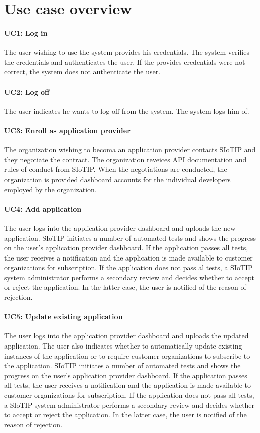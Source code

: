 \documentclass[english]{sareport}
\begin{document}
\section{Use case overview}\label{sec:uc_overview}
\paragraph{UC1: Log in}
The user wishing to use the system provides his credentials.
The system verifies the credentials and authenticates the user.
If the provides credentials were not correct, the system does not authenticate the user.

\paragraph{UC2: Log off}
The user indicates he wants to log off from the system.
The system logs him of.

\paragraph{UC3: Enroll as application provider}
The organization wishing to becoma an application provider contacts SIoTIP and they negotiate the contract. The organization reveices API documentation and rules of conduct from SIoTIP. When the negotiations are conducted, the organization is provided dashboard accounts for the individual developers employed by the organization.

\paragraph{UC4: Add application}
The user logs into the application provider dashboard and uploads the new application. SIoTIP initiates a number of automated tests and shows the progress on the user's application provider dashboard. If the application passes all tests, the user receives a notification and the application is made available to customer organizations for subscription. If the application does not pass al tests, a SIoTIP system administrator performs a secondary review and decides whether to accept or reject the application. In the latter case, the user is notified of the reason of rejection.

\paragraph{UC5: Update existing application}
The user logs into the application provider dashboard and uploads the updated application. The user also indicates whether to automatically update existing instances of the application or to require customer organizations to subscribe to the application. SIoTIP initiates a number of automated tests and shows the progress on the user's application provider dashboard. If the application passes all tests, the user receives a notification and the application is made available to customer organizations for subscription. If the application does not pass all tests, a SIoTIP system administrator performs a secondary review and decides whether to accept or reject the application. In the latter case, the user is notified of the reason of rejection.
\end{document}

